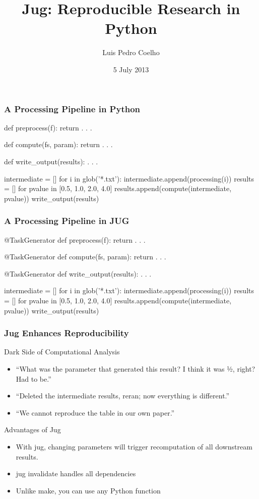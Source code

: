 \documentclass{beamer}
\title[Jug]{Jug: Reproducible Research in Python}
\author[luis@luispedro.org]{Luis Pedro Coelho}
\institute{EMBL}
\date{5 July 2013}
\begin{document}
\frame{\titlepage}

\begin{frame}[fragile]
\frametitle{A Processing Pipeline in Python}

\begin{python}

def preprocess(f):
    return . . .


def compute(fs, param):
    return . . .


def write_output(results):
    . . .

intermediate = []
for i in glob('*.txt'):
    intermediate.append(processing(i))
results = []
for pvalue in [0.5, 1.0, 2.0, 4.0]
    results.append(compute(intermediate, pvalue))
write_output(results)
\end{python}
\end{frame}

\begin{frame}[fragile]
\frametitle{A Processing Pipeline in \alert{JUG}}

\begin{python}
@TaskGenerator
def preprocess(f):
    return . . .

@TaskGenerator
def compute(fs, param):
    return . . .

@TaskGenerator
def write_output(results):
    . . .

intermediate = []
for i in glob('*.txt'):
    intermediate.append(processing(i))
results = []
for pvalue in [0.5, 1.0, 2.0, 4.0]
    results.append(compute(intermediate, pvalue))
write_output(results)
\end{python}
\end{frame}

\begin{frame}[fragile]
\frametitle{Jug Enhances Reproducibility}

\begin{block}{\alert{Dark Side} of Computational Analysis}
\begin{itemize}
\item ``What was the parameter that generated this result? I think it was ½, right? Had to be.''
\item ``Deleted the intermediate results, reran; now everything is different.''
\item ``We cannot reproduce the table in our own paper.''
\end{itemize}
\end{block}

\begin{block}{Advantages of Jug}


\begin{itemize}
\item With jug, changing parameters \alert{will trigger recomputation of all
downstream results}.
\item \alert{jug invalidate} handles all dependencies
\item Unlike \alert{make}, you can use any Python function
\end{itemize}

\end{block}

\end{frame}
\end{document}
